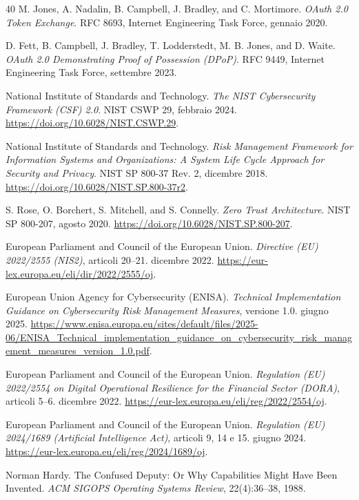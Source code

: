 \documentclass[10pt,oneside,openany]{book}
\begin{document}
\begin{thebibliography}{40}
M. Jones, A. Nadalin, B. Campbell, J. Bradley, and C. Mortimore.
\newblock \emph{OAuth 2.0 Token Exchange}.
\newblock RFC 8693, Internet Engineering Task Force, gennaio 2020.

D. Fett, B. Campbell, J. Bradley, T. Lodderstedt, M. B. Jones, and D. Waite.
\newblock \emph{OAuth 2.0 Demonstrating Proof of Possession (DPoP)}.
\newblock RFC 9449, Internet Engineering Task Force, settembre 2023.

National Institute of Standards and Technology.
\newblock \emph{The NIST Cybersecurity Framework (CSF) 2.0}.
\newblock NIST CSWP 29, febbraio 2024. \url{https://doi.org/10.6028/NIST.CSWP.29}.

National Institute of Standards and Technology.
\newblock \emph{Risk Management Framework for Information Systems and Organizations: A System Life Cycle Approach for Security and Privacy}.
\newblock NIST SP 800-37 Rev. 2, dicembre 2018. \url{https://doi.org/10.6028/NIST.SP.800-37r2}.

S. Rose, O. Borchert, S. Mitchell, and S. Connelly.
\newblock \emph{Zero Trust Architecture}.
\newblock NIST SP 800-207, agosto 2020. \url{https://doi.org/10.6028/NIST.SP.800-207}.

European Parliament and Council of the European Union.
\newblock \emph{Directive (EU) 2022/2555 (NIS2)}, articoli 20--21.
 dicembre 2022. \url{https://eur-lex.europa.eu/eli/dir/2022/2555/oj}.

European Union Agency for Cybersecurity (ENISA).
\newblock \emph{Technical Implementation Guidance on Cybersecurity Risk Management Measures}, versione 1.0.
\newblock giugno 2025. \url{https://www.enisa.europa.eu/sites/default/files/2025-06/ENISA_Technical_implementation_guidance_on_cybersecurity_risk_management_measures_version_1.0.pdf}.

European Parliament and Council of the European Union.
\newblock \emph{Regulation (EU) 2022/2554 on Digital Operational Resilience for the Financial Sector (DORA)}, articoli 5--6.
 dicembre 2022. \url{https://eur-lex.europa.eu/eli/reg/2022/2554/oj}.

European Parliament and Council of the European Union.
\newblock \emph{Regulation (EU) 2024/1689 (Artificial Intelligence Act)}, articoli 9, 14 e 15.
 giugno 2024. \url{https://eur-lex.europa.eu/eli/reg/2024/1689/oj}.

Norman Hardy.
\newblock The Confused Deputy: Or Why Capabilities Might Have Been Invented.
\newblock \emph{ACM SIGOPS Operating Systems Review}, 22(4):36--38, 1988.
\end{thebibliography}
\end{document}

